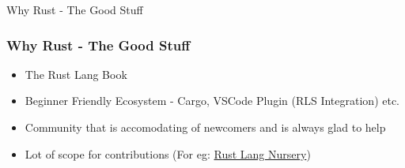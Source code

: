 \begin{section}{Why Rust - The Good Stuff}
  \begin{frame}
    \frametitle{Why Rust - The Good Stuff}
    \begin{itemize}
    \item The Rust Lang Book \cite{RustLang}
    \item Beginner Friendly Ecosystem - Cargo, VSCode Plugin (RLS Integration) etc.
    \item Community that is accomodating of newcomers and is always glad to help
    \item Lot of scope for contributions (For eg: \href{https://github.com/rust-lang-nursery/}{Rust Lang Nursery})
    \end{itemize}
  \end{frame}
\end{section}
